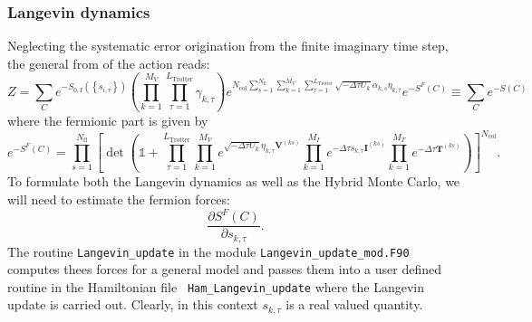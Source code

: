 

\subsubsection{Langevin dynamics}

Neglecting the  systematic error origination from the finite imaginary time step, the general from of the action reads:
\begin{equation}
   Z  =   \sum_{C}   e^{-S_{0,I} \left( \left\{ s_{i,\tau} \right\}  \right) }     \left( \prod_{k=1}^{M_V} \prod_{\tau=1}^{L_{\mathrm{Trotter}}} \gamma_{k,\tau} \right)
    e^{ N_{\mathrm{col}}\sum\limits_{s=1}^{N_{\mathrm{fl}}} \sum\limits_{k=1}^{M_V} \sum\limits_{\tau = 1}^{L_{\mathrm{Trotter}}}\sqrt{-\Delta \tau U_k}  \alpha_{k,s} \eta_{k,\tau} }  e^{ - S^{F}(C) }   \equiv \sum_{C} e^{-S(C)}
\end{equation}
where the fermionic part is  given by
\begin{equation}
e^{ - S^{F}(C) }  =  \prod_{s=1}^{N_{\mathrm{fl}}}\left[\det\left(  \mathds{1} + 
     \prod_{\tau=1}^{L_{\mathrm{Trotter}}}   
    \prod_{k=1}^{M_V}   e^{  \sqrt{ -\Delta \tau  U_k} \eta_{k,\tau} {\bm V}^{(ks)} }   \prod_{k=1}^{M_I}   e^{  -\Delta \tau s_{k,\tau}  {\bm I}^{(ks)}}  
     \prod_{k=1}^{M_T}   e^{-\Delta \tau {\bm T}^{(ks)}} 
     \right) \right]^{N_{\mathrm{col}}} .
\end{equation} 
To formulate both the Langevin dynamics as well as the Hybrid Monte Carlo, we will need  to estimate the fermion forces: 
\begin{equation}
	\frac { \partial S^F(C)}{\partial s_{k,\tau} }.
\end{equation}
The routine  \texttt{Langevin\_update} in the module \texttt{Langevin\_update\_mod.F90}   computes  thees forces  for a  general model and passes  them into a user defined routine in the Hamiltonian file  \texttt{ Ham\_Langevin\_update}  where the Langevin update is carried out.    Clearly, in this context 
$ s_{k,\tau}$  is a real valued quantity. 

